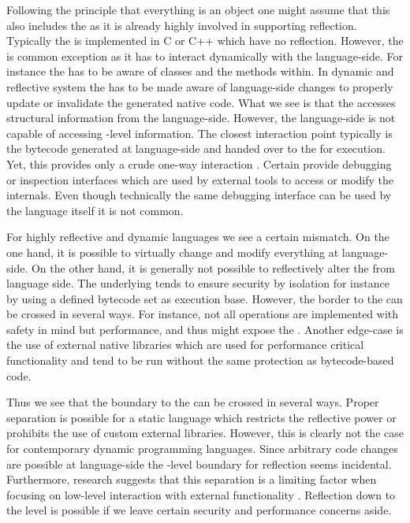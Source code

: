 Following the principle that everything is an object one might assume that this also includes the \VM as it is already highly involved in supporting reflection.
Typically the \VM is implemented in C or C++ which have no reflection.
However, the \JIT is common exception as it has to interact dynamically with the language-side.
For instance the \JIT has to be aware of classes and the methods within.
In dynamic and reflective system the \JIT has to be made aware of language-side changes to properly update or invalidate the generated native code.
What we see is that the \JIT accesses structural information from the language-side.
However, the language-side is not capable of accessing \VM-level information.
The closest \VM interaction point typically is the bytecode generated at language-side and handed over to the \VM for execution.
Yet, this provides only a crude one-way interaction \cite{Kell12a}.
Certain \VMs provide debugging or inspection interfaces which are used by external tools to access or modify the \VM internals.
Even though technically the same \VM debugging interface can be used by the language itself it is not common.

For highly reflective and dynamic languages we see a certain mismatch.
On the one hand, it is possible to virtually change and modify everything at language-side.
On the other hand, it is generally not possible to reflectively alter the \VM from language side.
The underlying \VM tends to ensure security by isolation for instance by using a defined bytecode set as execution base.
However, the border to the \VM can be crossed in several ways.
For instance, not all operations are implemented with safety in mind but performance, and thus might expose the \VM.
Another edge-case is the use of external native libraries which are used for performance critical functionality and tend to be run without the same protection as bytecode-based code.

Thus we see that the boundary to the \VM can be crossed in several ways.
Proper separation is possible for a static language which restricts the reflective power or prohibits the use of custom external libraries.
However, this is clearly not the case for contemporary dynamic programming languages.
Since arbitrary code changes are possible at language-side the \VM-level boundary for reflection seems incidental.
Furthermore, research suggests that this separation is a limiting factor when focusing on low-level interaction with external functionality \cite{Kell11a}.
Reflection down to the \VM level is possible if we leave certain security and performance concerns aside.

